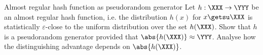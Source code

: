 \documentclass{crypto-exercise}
\author{Sven Laur}
\begin{document}
\begin{exercise}{Almost regular hash function as pseudorandom generator}
Let $h:\XXX\to\YYY$ be an almost regular hash function, i.e. the distribution $h(x)$ for $x\getsu\XXX$ is statistically $\varepsilon$-close to the uniform distribution over the set $h(\XXX)$.
Show that $h$ is a pseudorandom generator provided that $\abs{h(\XXX)}\approx \YYY$. 
Analyse how the distinguishing advantage depends on $\abs{h(\XXX)}$.
\end{exercise}


\begin{solution}
\end{solution}
\end{document}
